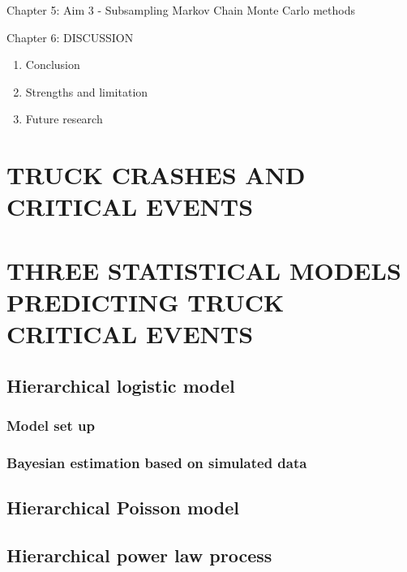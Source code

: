 \documentclass[12pt]{book}
\numberwithin{equation}{chapter}
\providecommand{\tightlist}{%
  \setlength{\itemsep}{0pt}\setlength{\parskip}{0pt}}
\begin{document}
Chapter 5: Aim 3 - Subsampling Markov Chain Monte Carlo methods

Chapter 6: DISCUSSION

\begin{enumerate}
\def\labelenumi{\Alph{enumi}.}
\tightlist
\item
  Conclusion
\item
  Strengths and limitation
\item
  Future research
\end{enumerate}

\hypertarget{truck-crashes-and-critical-events-1}{%
\chapter{TRUCK CRASHES AND CRITICAL EVENTS}\label{truck-crashes-and-critical-events-1}}

\hypertarget{three-statistical-models-predicting-truck-critical-events}{%
\chapter{THREE STATISTICAL MODELS PREDICTING TRUCK CRITICAL EVENTS}\label{three-statistical-models-predicting-truck-critical-events}}

\hypertarget{hierarchical-logistic-model}{%
\section{Hierarchical logistic model}\label{hierarchical-logistic-model}}

\hypertarget{model-set-up}{%
\subsection{Model set up}\label{model-set-up}}

\hypertarget{bayesian-estimation-based-on-simulated-data}{%
\subsection{Bayesian estimation based on simulated data}\label{bayesian-estimation-based-on-simulated-data}}

\hypertarget{hierarchical-poisson-model}{%
\section{Hierarchical Poisson model}\label{hierarchical-poisson-model}}

\hypertarget{hierarchical-power-law-process}{%
\section{Hierarchical power law process}\label{hierarchical-power-law-process}}
\end{document}
